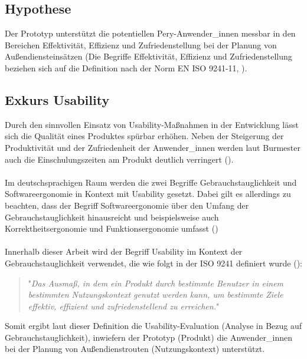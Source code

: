 \documentclass[Bachelorarbeit.tex]{subfiles}
\begin{document}
\subsection{Hypothese}
\label{Hypothese}

Der Prototyp unterstützt die potentiellen Pery-Anwender\_innen messbar in den Bereichen Effektivität, Effizienz und Zufriedenstellung bei der Planung von Außendiensteinsätzen (Die Begriffe Effektivität, Effizienz und Zufriedenstellung beziehen sich auf die Definition nach der Norm EN ISO 9241-11, \cite[vgl.][Abs.: 3]{Iso9241_11}).


\subsection{Exkurs Usability}  
\label{Usability}
Durch den sinnvollen Einsatz von Usability-Maßnahmen in der Entwicklung lässt sich die Qualität eines Produktes spürbar erhöhen.
Neben der Steigerung der Produktivität und der Zufriedenheit der Anwender\_innen werden laut Burmester auch die Einschulungszeiten am Produkt deutlich verringert (\cite[vgl.][352f]{Burmester}).\\
\\
Im deutschsprachigen Raum werden die zwei Begriffe Gebrauchstauglichkeit und Softwareergonomie in Kontext mit Usability gesetzt.
Dabei gilt es allerdings zu beachten, dass der Begriff Softwareergonomie über den Umfang der Gebrauchstauglichkeit hinausreicht und beispielsweise auch Korrektheitsergonomie und Funktionsergonomie umfasst
(\cite[vgl.][420]{Niegemann2008})\\
\\
Innerhalb dieser Arbeit wird der Begriff Usability im Kontext der Gebrauchstauglichkeit verwendet, die wie folgt in der ISO 9241 definiert wurde (\cite[siehe:][Abs.: 3.1 Gebrauchstauglichkeit]{Iso9241_11}):

\begin{quote}
	"\textit{Das Ausmaß, in dem ein Produkt durch bestimmte Benutzer in einem bestimmten Nutzungskontext genutzt werden kann, um bestimmte Ziele effektiv, effizient und zufriedenstellend zu erreichen.}" 
\end{quote}

Somit ergibt laut dieser Definition die Usability-Evaluation (Analyse in Bezug auf Gebrauchstauglichkeit), inwiefern der Prototyp (Produkt) die Anwender\_innen bei der Planung von Außendienstrouten (Nutzungskontext) unterstützt.
\pagebreak
\end{document}
